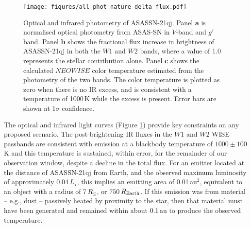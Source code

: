 \documentclass[sn-nature]{sn-jnl}%
\begin{document}
\begin{figure}
\begin{centering}
\texttt{[image: figures/all\_phot\_nature\_delta\_flux.pdf]}
\caption{Optical and infrared photometry of ASASSN-21qj.
%
Panel {\bf a} is normalised optical photometry from ASAS-SN in $V$-band and $g'$ band.
%
Panel {\bf b} shows the fractional flux increase in brightness of ASASSN-21qj in both the $W1$ and $W2$ bands, where a value of 1.0 represents the stellar contribution alone.
%
Panel {\bf c} shows the calculated $NEOWISE$ color temperature estimated from the photometry of the two bands.
%
The color temperature is plotted as zero when there is no IR excess, and is consistent with a temperature of 1000\,K while the excess is present.
%
Error bars are shown at $1\sigma$ confidence.
}
\label{fig:wisephot}
\end{centering}
\end{figure}





The optical and infrared light curves (Figure \ref{fig:wisephot}) provide key constraints on any proposed scenario.
%
The post-brightening IR fluxes in the $W1$ and $W2$ WISE passbands are consistent with emission at a blackbody temperature of $1000 \pm 100$\,K and this temperature is sustained, within error, for the remainder of our observation window, despite a decline in the total flux.
%
For an emitter located at the distance of ASASSN-21qj from Earth, and the observed  maximum luminosity of approximately 0.04\,$L_\star$, this implies an emitting area of 0.01\,au$^2$, equivalent to an object with a radius of 7\,$R_\odot$, or $750$\,$R_{\rm Earth}$.
%
If this emission was from material -- e.g., dust -- passively heated by proximity to the star, then that material must have been generated and remained within about 0.1\,au to produce the observed temperature.
\end{document}
